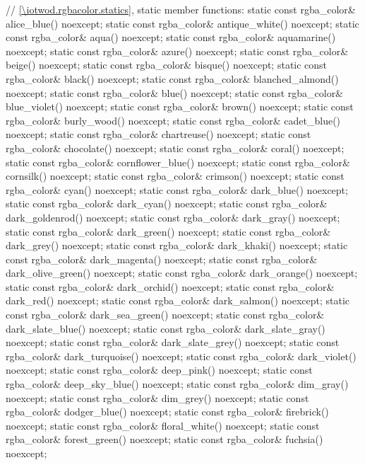 \begin{codeblock}
{{{{{    // \ref{\iotwod.rgbacolor.statics}, static member functions:
    static const rgba_color& alice_blue() noexcept;
    static const rgba_color& antique_white() noexcept;
    static const rgba_color& aqua() noexcept;
    static const rgba_color& aquamarine() noexcept;
    static const rgba_color& azure() noexcept;
    static const rgba_color& beige() noexcept;
    static const rgba_color& bisque() noexcept;
    static const rgba_color& black() noexcept;
    static const rgba_color& blanched_almond() noexcept;
    static const rgba_color& blue() noexcept;
    static const rgba_color& blue_violet() noexcept;
    static const rgba_color& brown() noexcept;
    static const rgba_color& burly_wood() noexcept;
    static const rgba_color& cadet_blue() noexcept;
    static const rgba_color& chartreuse() noexcept;
    static const rgba_color& chocolate() noexcept;
    static const rgba_color& coral() noexcept;
    static const rgba_color& cornflower_blue() noexcept;
    static const rgba_color& cornsilk() noexcept;
    static const rgba_color& crimson() noexcept;
    static const rgba_color& cyan() noexcept;
    static const rgba_color& dark_blue() noexcept;
    static const rgba_color& dark_cyan() noexcept;
    static const rgba_color& dark_goldenrod() noexcept;
    static const rgba_color& dark_gray() noexcept;
    static const rgba_color& dark_green() noexcept;
    static const rgba_color& dark_grey() noexcept;
    static const rgba_color& dark_khaki() noexcept;
    static const rgba_color& dark_magenta() noexcept;
    static const rgba_color& dark_olive_green() noexcept;
    static const rgba_color& dark_orange() noexcept;
    static const rgba_color& dark_orchid() noexcept;
    static const rgba_color& dark_red() noexcept;
    static const rgba_color& dark_salmon() noexcept;
    static const rgba_color& dark_sea_green() noexcept;
    static const rgba_color& dark_slate_blue() noexcept;
    static const rgba_color& dark_slate_gray() noexcept;
    static const rgba_color& dark_slate_grey() noexcept;
    static const rgba_color& dark_turquoise() noexcept;
    static const rgba_color& dark_violet() noexcept;
    static const rgba_color& deep_pink() noexcept;
    static const rgba_color& deep_sky_blue() noexcept;
    static const rgba_color& dim_gray() noexcept;
    static const rgba_color& dim_grey() noexcept;
    static const rgba_color& dodger_blue() noexcept;
    static const rgba_color& firebrick() noexcept;
    static const rgba_color& floral_white() noexcept;
    static const rgba_color& forest_green() noexcept;
    static const rgba_color& fuchsia() noexcept;
}}}}}
\end{codeblock}
